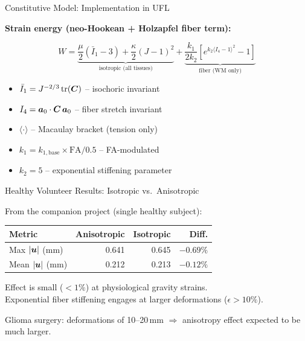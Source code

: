 \begin{frame}{Constitutive Model: Implementation in UFL}

  \small

  \textbf{Strain energy (neo-Hookean + Holzapfel fiber term):}

  \[
    W = \underbrace{\frac{\mu}{2}(\bar{I}_1 - 3)
      + \frac{\kappa}{2}(J-1)^2}_{\text{isotropic (all tissues)}}
      + \underbrace{\frac{k_1}{2k_2}\left[
        e^{k_2\langle I_4 - 1\rangle^2} - 1
      \right]}_{\text{fiber (WM only)}}
  \]

  \begin{itemize}
    \item $\bar{I}_1 = J^{-2/3}\,\text{tr}(\bm{C})$ -- isochoric invariant
    \item $I_4 = \bm{a}_0 \cdot \bm{C}\,\bm{a}_0$ -- fiber stretch invariant
    \item $\langle \cdot \rangle$ -- Macaulay bracket (tension only)
    \item $k_1 = k_{1,\text{base}} \times \text{FA}/0.5$ -- FA-modulated
    \item $k_2 = 5$ -- exponential stiffening parameter
  \end{itemize}

\end{frame}

\begin{frame}{Healthy Volunteer Results: Isotropic vs.\ Anisotropic}

  From the companion project (single healthy subject):

  \bigskip

  \begin{tabular}{lrrr}
    \toprule
    \textbf{Metric} & \textbf{Anisotropic} & \textbf{Isotropic} &
      \textbf{Diff.} \\
    \midrule
    Max $|\bm{u}|$ (mm)  & 0.641 & 0.645 & $-0.69\%$ \\
    Mean $|\bm{u}|$ (mm) & 0.212 & 0.213 & $-0.12\%$ \\
    \bottomrule
  \end{tabular}

  \bigskip

  Effect is small ($<1\%$) at physiological gravity strains.\\
  Exponential fiber stiffening engages at larger deformations
  ($\epsilon > 10\%$).

  \bigskip

  \alert{Glioma surgery:} deformations of 10--20\,mm $\Rightarrow$
  anisotropy effect expected to be much larger.

\end{frame}

